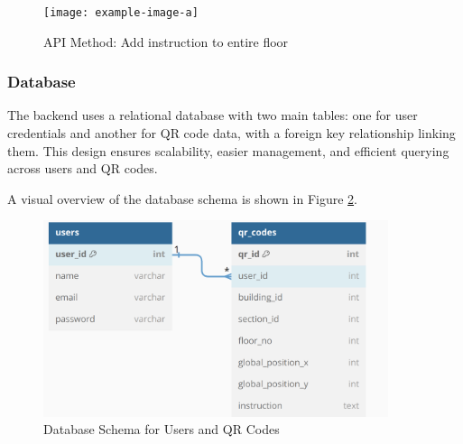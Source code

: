 \begin{figure}[h] \centering \texttt{[image: example-image-a]} \caption{API Method: Add instruction to entire floor} 
	\label{fig:api_method} 
	\end{figure}

\subsubsection{Database}

The backend uses a relational database with two main tables: one for user credentials and another for QR code data, with a foreign key relationship linking them. This design ensures scalability, easier management, and efficient querying across users and QR codes.

A visual overview of the database schema is shown in Figure \ref{fig:database_schema}.

\begin{figure}[h]
	\centering
	\includegraphics[width=0.9\textwidth]{assets/ch3/db_schema.png}
	\caption{Database Schema for Users and QR Codes}
	\label{fig:database_schema}
\end{figure}

